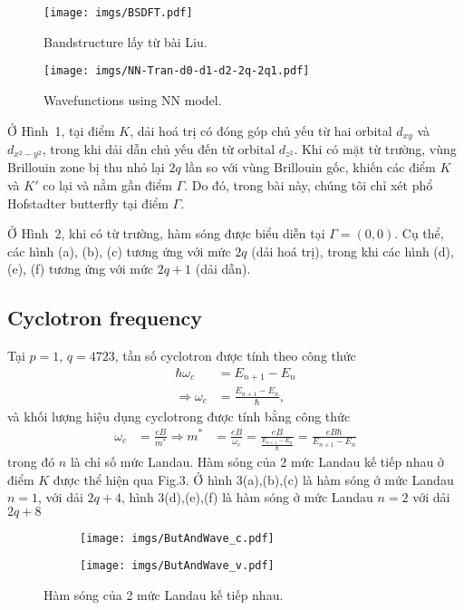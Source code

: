 \documentclass{article}
\begin{document}
\begin{figure*}[htb]
	\centering
	\texttt{[image: imgs/BSDFT.pdf]}
	\caption{Bandstructure lấy từ bài Liu.}
\end{figure*}
\begin{figure*}[htb]
	\centering
	\texttt{[image: imgs/NN-Tran-d0-d1-d2-2q-2q1.pdf]}
	\caption{Wavefunctions using NN model.}
\end{figure*}
Ở {Hình~1}, tại điểm $K$, dải hoá trị có đóng góp chủ yếu từ hai orbital $d_{xy}$ và $d_{x^{2} - y^{2}}$, trong khi dải dẫn chủ yếu đến từ orbital $d_{z^{2}}$. Khi có mặt từ trường, vùng Brillouin zone bị thu nhỏ lại $2q$ lần so với vùng Brillouin gốc, khiến các điểm $K$ và $K'$ co lại và nằm gần điểm $\Gamma$. Do đó, trong bài này, chúng tôi chỉ xét phổ Hofstadter butterfly tại điểm $\Gamma$.

Ở {Hình~2}, khi có từ trường, hàm sóng được biểu diễn tại $\Gamma = (0,0)$. Cụ thể, các hình {(a)}, {(b)}, {(c)} tương ứng với mức $2q$ (dải hoá trị), trong khi các hình {(d)}, {(e)}, {(f)} tương ứng với mức $2q+1$ (dải dẫn).

\subsection{Cyclotron frequency}
Tại $p = 1$, $q = 4723$, tần số cyclotron được tính theo công thức
\begin{equation}
	\begin{aligned}
		\hbar \omega_{c}       & = E_{n+1} - E_{n}                \\
		\Rightarrow \omega_{c} & = \frac{E_{n+1} - E_{n}}{\hbar},
	\end{aligned}
\end{equation}
và khối lượng hiệu dụng cyclotrong được tính bằng công thức
\begin{equation}
	\begin{aligned}
		\omega_{c}        & = \frac{eB}{m^{*}}
		\Rightarrow m^{*} & =  \frac{eB}{\omega_{c}} = \frac{eB}{\frac{E_{n+1} - E_{n}}{\hbar}} = \frac{eB \hbar}{E_{n+1} - E_{n}}
	\end{aligned}
\end{equation}
trong đó $n$ là chỉ số mức Landau. Hàm sóng của 2 mức Landau kế tiếp nhau ở điểm $K$ được thể hiện qua Fig.3. Ở hình 3(a),(b),(c) là hàm sóng ở mức Landau $n=1$, với dải $2q+4$, hình 3(d),(e),(f) là hàm sóng ở mức Landau $n=2$ với dải $2q+8$
\begin{figure}[htb]
	\begin{subfigure}{0.495\textwidth}
		\centering
		\texttt{[image: imgs/ButAndWave\_c.pdf]}
	\end{subfigure}
	\begin{subfigure}{0.495\textwidth}
		\centering
		\texttt{[image: imgs/ButAndWave\_v.pdf]}
	\end{subfigure}
	\caption{Hàm sóng của 2 mức Landau kế tiếp nhau.}
\end{figure}
\end{document}
